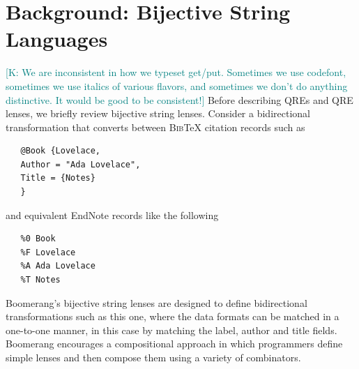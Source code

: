 \documentclass[acmsmall,review,anonymous]{acmart}
\newcommand{\FINISH}[3]{\ifdraft\textcolor{#1}{[#2: #3]}\fi}
\newcommand{\ksf}[1]{\FINISH{teal}{K}{#1}}
\newcommand{\bibtex}{\textsc{Bib}\TeX{}}
\begin{document}
\section{Background: Bijective String Languages}
\label{sec:background}
\iflastminute
\ksf{We are inconsistent in how we typeset get/put.  Sometimes we use
codefont, sometimes we use italics of various flavors, and sometimes
we don't do anything distinctive.  It would be good to be consistent!}
\fi
Before describing QREs and QRE lenses, we briefly review bijective
string lenses. Consider a bidirectional transformation that converts
between \bibtex{} citation records such as
\begin{verbatim}
   @Book {Lovelace,
   Author = "Ada Lovelace",
   Title = {Notes}
   }
\end{verbatim}
\noindent
and equivalent EndNote records like the following
\begin{verbatim}
   %0 Book
   %F Lovelace
   %A Ada Lovelace
   %T Notes
\end{verbatim}
\noindent
Boomerang's bijective string lenses are designed to define bidirectional
transformations such as this one, where the data formats can be matched in a
one-to-one manner, in this case by matching the label, author and title fields.
Boomerang encourages a compositional approach in which programmers
define simple lenses and then compose them using a variety of
combinators. 
\end{document}
